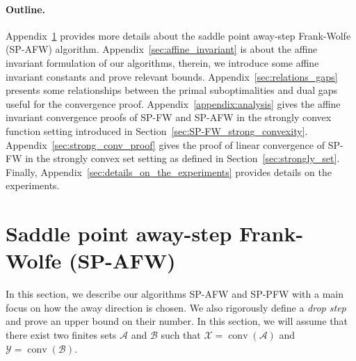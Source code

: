 \documentclass[twoside]{article}
\newcommand{\X}{\mathcal{X}}
\newcommand{\Y}{\mathcal{Y}}
\DeclareMathOperator*{\conv}{conv}
\newcommand{\A}{\mathcal{A}}
\newcommand{\B}{\mathcal{B}}
\newcommand{\0}{\mathbf{0}} %
\begin{document}
  \paragraph{Outline.} %
  \label{par:outline}
  Appendix~\ref{sec:away_step_frank_wolfe} provides more details about the saddle point away-step Frank-Wolfe (SP-AFW) algorithm. Appendix~\ref{sec:affine_invariant} is about the affine invariant formulation of our algorithms, therein, we introduce some affine invariant constants and prove relevant bounds. 
  Appendix~\ref{sec:relations_gaps} presents some relationships between the primal suboptimalities and dual gaps useful for the convergence proof.
  Appendix~\ref{appendix:analysis} gives the affine invariant convergence proofs of SP-FW and SP-AFW in the strongly convex function setting introduced in Section~\ref{sec:SP-FW_strong_convexity}. 
  Appendix~\ref{sec:strong_conv_proof} gives the proof of linear convergence of SP-FW in the strongly convex set setting as defined in Section~\ref{sec:strongly_set}.
  Finally, Appendix~\ref{sec:details_on_the_experiments} provides details on the experiments.
  
  \section{Saddle point away-step Frank-Wolfe (SP-AFW)} %
  \label{sec:away_step_frank_wolfe}
  In this section, we describe our algorithms SP-AFW and SP-PFW with a main focus on how the away direction is chosen. We also rigorously define a \emph{drop step} and prove an upper bound on their number. In this section, we will assume that there exist two finites sets $\A$ and $\B$ such that 
  $\X = \conv(\A)$ and $\Y = \conv(\B)$.
\end{document}
